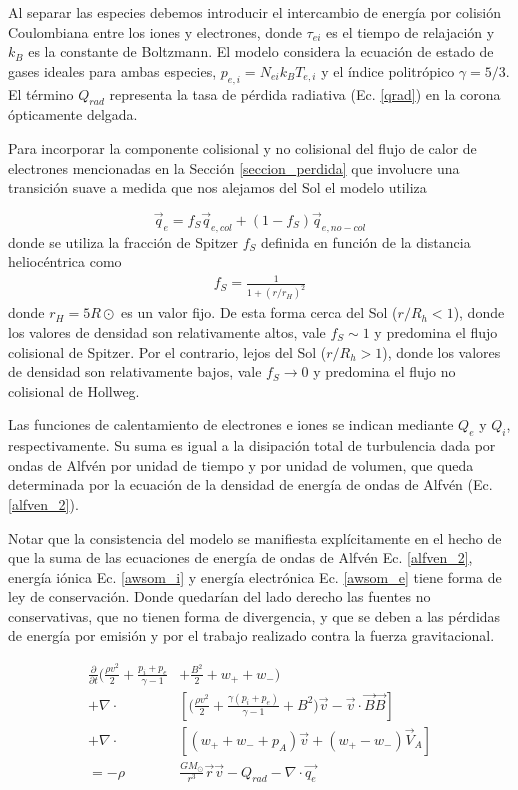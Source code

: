 \documentclass[a4paper,11pt]{report}
\begin{document}
Al separar las especies debemos introducir el intercambio de energía por colisión Coulombiana entre los iones y electrones, donde $\tau_{ei}$ es el tiempo de relajación  y $k_B$ es la constante de Boltzmann. El modelo considera la ecuación de estado de gases ideales para ambas especies, $p_{e,i}= N_{ei}k_B T_{e,i}$ y el índice politrópico $\gamma = 5/3$. El término $Q_{rad}$ representa la tasa de pérdida radiativa (Ec. \ref{qrad}) en la corona ópticamente delgada.

Para incorporar la componente colisional y no colisional del flujo de calor de electrones mencionadas en la Sección \ref{seccion_perdida} que involucre una transición suave a medida que nos alejamos del Sol el modelo utiliza

\begin{equation}
  \vec{q}_e = f_S \vec{q}_{e,col} + (1-f_S) \vec{q}_{e,no-col}
\end{equation}
donde se utiliza la fracción de Spitzer $f_S$ definida en función de la distancia heliocéntrica como
\begin{eqnarray}
  f_S = \frac{1}{1+(r/r_H)^2}
\end{eqnarray}
donde $r_H =5 R\odot$ es un valor fijo. De esta forma cerca del Sol ($r/R_h <1$), donde los valores de densidad son relativamente altos, vale $f_S \sim 1$ y predomina el flujo colisional de Spitzer. Por el contrario, lejos del Sol ($r/R_h >1$), donde los valores de densidad son relativamente bajos, vale $f_S \rightarrow 0$ y predomina el flujo no colisional de Hollweg.


Las funciones de calentamiento de electrones e iones se indican mediante $Q_e$ y $Q_i$, respectivamente. Su suma es igual a la disipación total de turbulencia dada por ondas de Alfvén por unidad de tiempo y por unidad de volumen, que queda determinada por la ecuación de la densidad de energía de ondas de Alfvén (Ec. \ref{alfven_2}).

Notar que la consistencia del modelo se manifiesta explícitamente en el hecho de que la suma de las ecuaciones de energía de ondas de Alfvén Ec. \ref{alfven_2}, energía iónica Ec. \ref{awsom_i} y energía electrónica Ec. \ref{awsom_e} tiene forma de ley de conservación. Donde quedarían del lado derecho las fuentes no conservativas, que no tienen forma de divergencia, y que se deben a las pérdidas de energía por emisión y por el trabajo realizado contra la fuerza gravitacional.  



\begin{equation}
\begin{split} 
 \frac{\partial}{\partial t} \Bigg( \frac{\rho v^2}{2} + \frac{p_i + p_e}{\gamma -1} &+\frac{B^2}{2} +w_+ + w_-\Bigg)  \\
 + \nabla \cdot  &\left[ \Bigg( \frac{\rho v^2}{2} + \frac{ \gamma (p_i+p_e)}{ \gamma -1} + B^2 \Bigg) \vec{v} -\vec{v}\cdot  \vec{B}\vec{B}  \right] \\
 +\nabla \cdot & [(w_+ + w_-+p_A)\vec{v} + (w_+ -w_-)\vec{V}_A]\\
=-\rho & \frac{GM_{\odot}}{r^3} \vec{r}\vec{v}  - Q_{rad} -\nabla \cdot \vec{q_e}  \label{awsom_final}
\end{split}
\end{equation}
\end{document}

